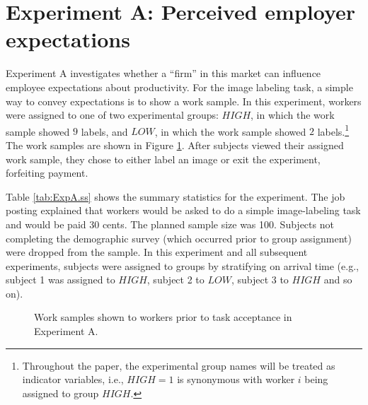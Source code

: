 \documentclass[12pt]{article}
\begin{document}
\section{Experiment A: Perceived employer expectations} 
Experiment A investigates whether a ``firm'' in this market can
influence employee expectations about productivity. For the image
labeling task, a simple way to convey expectations is to show a work
sample. In this experiment, workers were assigned to one of two
experimental groups: $HIGH$, in which the work sample showed $9$
labels, and $LOW$, in which the work sample showed $2$
labels.\footnote{Throughout the paper, the experimental group names
  will be treated as indicator variables, i.e., $HIGH=1$ is synonymous
  with worker $i$ being assigned to group $HIGH$.}  The work samples
are shown in Figure \ref{fig:work.samples}.  After subjects viewed
their assigned work sample, they chose to either label an image or
exit the experiment, forfeiting payment.



Table \ref{tab:ExpA.ss} shows the summary statistics for the
experiment. The job posting explained that workers would be asked to
do a simple image-labeling task and would be paid 30 cents. The
planned sample size was 100. Subjects not completing the demographic
survey (which occurred prior to group assignment) were dropped from
the sample. In this experiment and all subsequent experiments,
subjects were assigned to groups by stratifying on arrival time (e.g.,
subject 1 was assigned to $HIGH$, subject 2 to $LOW$, subject 3 to
$HIGH$ and so on).

\begin{figure}
  \centering 
  \caption{Work samples shown to workers prior to task acceptance in
    Experiment A.\label{fig:work.samples}}
\end{figure} 
\end{document}

